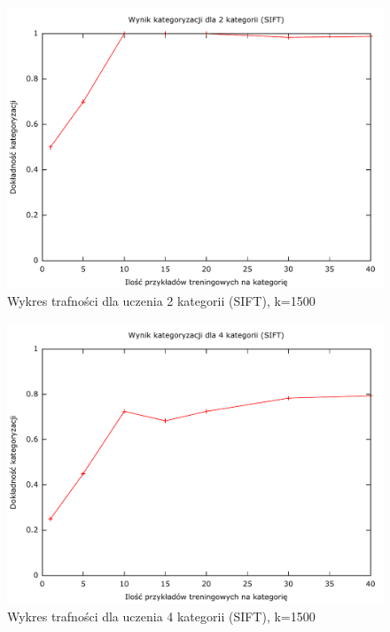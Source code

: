 \begin{figure}[h]
	\centering
	\includegraphics[scale=0.8]{graphics/04_interpretacja_wynikow/result-sift-2.pdf}
	\caption{ Wykres trafności dla uczenia 2 kategorii (SIFT), k=1500 }
	\label{fig:result-sift-2}
\end{figure}

\begin{figure}[h]
	\centering
	\includegraphics[scale=0.8]{graphics/04_interpretacja_wynikow/result-sift-4.pdf}
	\caption{ Wykres trafności dla uczenia 4 kategorii (SIFT), k=1500 }
	\label{fig:result-sift-4}
\end{figure}

